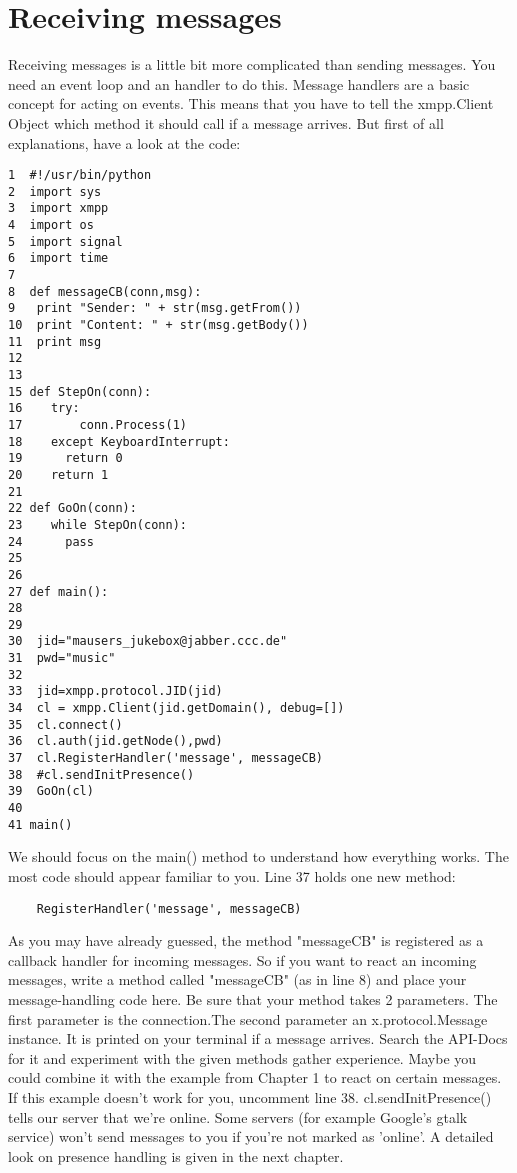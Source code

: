 \chapter{Receiving messages}

Receiving messages is a little bit more complicated than sending messages. You need an event loop and an handler to do this.
\newline
Message handlers are a basic concept for acting on events. This means that you have to tell the xmpp.Client Object which method it should call if a message arrives. But first of all explanations, have a look at the code:
\newline
\newline
\begin{verbatim}
1  #!/usr/bin/python
2  import sys
3  import xmpp
4  import os
5  import signal
6  import time
7
8  def messageCB(conn,msg):
9 	print "Sender: " + str(msg.getFrom())
10	print "Content: " + str(msg.getBody())
11	print msg
12
13
15 def StepOn(conn):
16    try:
17        conn.Process(1)
18    except KeyboardInterrupt:
19	    return 0
20    return 1
21
22 def GoOn(conn):
23    while StepOn(conn):
24	    pass
25
26
27 def main():
28
29
30	jid="mausers_jukebox@jabber.ccc.de"
31	pwd="music"
32
33	jid=xmpp.protocol.JID(jid)
34	cl = xmpp.Client(jid.getDomain(), debug=[])
35	cl.connect()
36	cl.auth(jid.getNode(),pwd)
37	cl.RegisterHandler('message', messageCB)
38	#cl.sendInitPresence()
39	GoOn(cl)
40
41 main()
\end{verbatim}
We should focus on the main() method to understand how everything works. The most code should appear familiar to you. Line 37 holds one new method: \begin{verbatim}	RegisterHandler('message', messageCB)\end{verbatim}
As you may have already guessed, the method "messageCB" is registered as a callback handler for incoming messages. So if you want to react an incoming messages, write a method called "messageCB" (as in line 8)
and place your message-handling code here. Be sure that your method takes 2 parameters.
The first parameter is the connection.The second parameter an x.protocol.Message instance. It is printed on your terminal if a message arrives. Search the API-Docs for it and experiment with the given methods gather experience. Maybe you could combine it with the example from Chapter 1 to react on certain messages.
\newline
\newline
If this example doesn't work for you, uncomment line 38. cl.sendInitPresence() tells our server that we're online. Some servers (for example Google's gtalk service) won't send messages to you if you're not marked as 'online'. A detailed look on presence handling is given in the next chapter.





